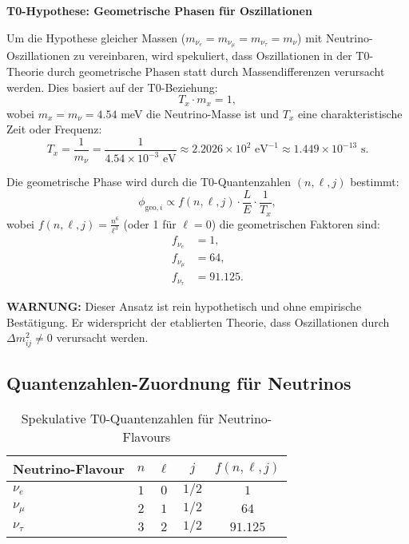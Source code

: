 \documentclass[12pt,a4paper]{article}
\begin{document}
	\begin{speculation}
		\textbf{T0-Hypothese: Geometrische Phasen für Oszillationen}
		
		Um die Hypothese gleicher Massen ($m_{\nu_e} = m_{\nu_\mu} = m_{\nu_\tau} = m_\nu$) mit Neutrino-Oszillationen zu vereinbaren, wird spekuliert, dass Oszillationen in der T0-Theorie durch geometrische Phasen statt durch Massendifferenzen verursacht werden. Dies basiert auf der T0-Beziehung:
		\[
		T_x \cdot m_x = 1,
		\]
		wobei $m_x = m_\nu = 4.54$ meV die Neutrino-Masse ist und $T_x$ eine charakteristische Zeit oder Frequenz:
		\[
		T_x = \frac{1}{m_\nu} = \frac{1}{4.54 \times 10^{-3} \text{ eV}} \approx 2.2026 \times 10^2 \text{ eV}^{-1} \approx 1.449 \times 10^{-13} \text{ s}.
		\]
		
		Die geometrische Phase wird durch die T0-Quantenzahlen $(n, \ell, j)$ bestimmt:
		\[
		\phi_{\text{geo}, i} \propto f(n, \ell, j) \cdot \frac{L}{E} \cdot \frac{1}{T_x},
		\]
		wobei $f(n, \ell, j) = \frac{n^6}{\ell^3}$ (oder 1 für $\ell = 0$) die geometrischen Faktoren sind:
		\begin{align}
			f_{\nu_e} &= 1, \\
			f_{\nu_\mu} &= 64, \\
			f_{\nu_\tau} &= 91.125.
		\end{align}
		
		\textbf{WARNUNG:} Dieser Ansatz ist rein hypothetisch und ohne empirische Bestätigung. Er widerspricht der etablierten Theorie, dass Oszillationen durch $\Delta m^2_{ij} \neq 0$ verursacht werden.
	\end{speculation}
	
	\subsection{Quantenzahlen-Zuordnung für Neutrinos}
	
	\begin{table}[h]
		\centering
		\begin{tabular}{lcccc}
			\toprule
			\textbf{Neutrino-Flavour} & \textbf{$n$} & \textbf{$\ell$} & \textbf{$j$} & \textbf{$f(n,\ell,j)$} \\
			\midrule
			$\nu_e$ & $1$ & $0$ & $1/2$ & $1$ \\
			$\nu_\mu$ & $2$ & $1$ & $1/2$ & $64$ \\
			$\nu_\tau$ & $3$ & $2$ & $1/2$ & $91.125$ \\
			\bottomrule
		\end{tabular}
		\caption{Spekulative T0-Quantenzahlen für Neutrino-Flavours}
	\end{table}
	
\end{document}
